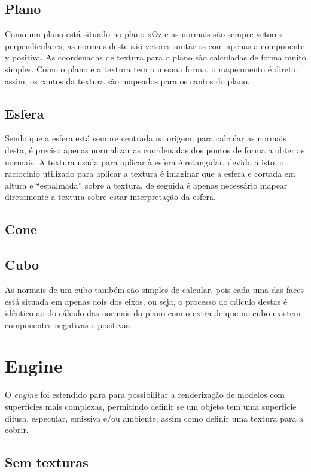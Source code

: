 \documentclass[a4paper]{article}
\begin{document}
\subsection{Plano}
Como um plano está situado no plano xOz e as normais são sempre vetores perpendiculares, as normais deste são vetores unitários com apenas a componente y positiva.
As coordenadas de textura para o plano são calculadas de forma muito simples. Como o plano e a textura tem a mesma forma, o mapeamento é direto, assim, os cantos da textura são mapeados para os cantos do plano.

\subsection{Esfera}
Sendo que a esfera está sempre centrada na origem, para calcular as normais desta, é preciso apenas normalizar as coordenadas dos pontos de forma a obter as normais.
A textura usada para aplicar à esfera é retangular, devido a isto, o raciocínio utilizado para aplicar a textura é imaginar que a esfera e cortada em altura e ``espalmada'' sobre a textura, de seguida é apenas necessário mapear diretamente a textura sobre estar interpretação da esfera.

\subsection{Cone}


\subsection{Cubo}
As normais de um cubo também são simples de calcular, pois cada uma das faces está situada em apenas dois dos eixos, ou seja, o processo do cálculo destas é idêntico ao do cálculo das normais do plano com o extra de que no cubo existem componentes negativas e positivas. 



\section{Engine}

O \textit{engine} foi estendido para para possibilitar a renderização de modelos com superfícies mais complexas, permitindo definir se um objeto tem uma superfície difusa, especular, emissiva e/ou ambiente, assim como definir uma textura para a cobrir.

\subsection{Sem texturas}
\end{document}
